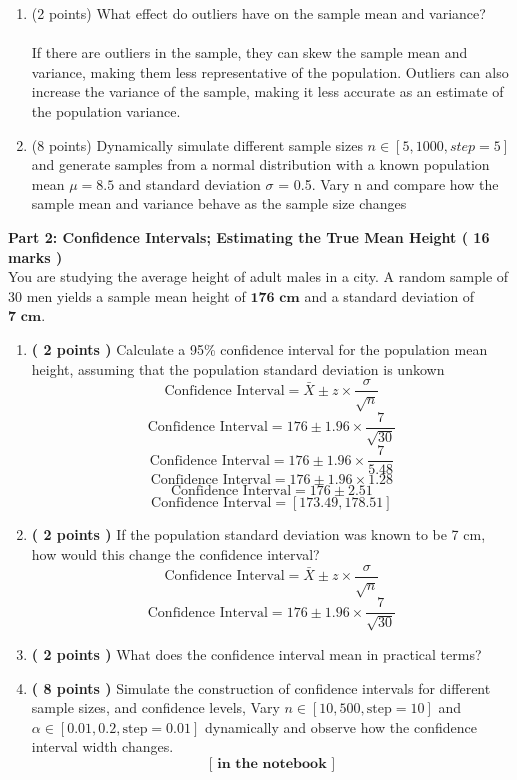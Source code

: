 \documentclass[a3paper,12pt]{extarticle} %
\begin{document}
\begin{enumerate}
        \item (2 points) What effect do outliers have on the sample mean and variance?
        \\ \\ If there are outliers in the sample, they can skew the sample mean and variance, making them less representative of the population. Outliers can also increase the variance of the sample, making it less accurate as an estimate of the population variance.
        \item (8 points) Dynamically simulate different sample sizes \(n \in [5, 1000, step=5]\) and generate samples
        from a normal distribution with a known population mean \(\mu = 8.5\) and standard deviation \(\sigma\) = 0.5.
        Vary n and compare how the sample mean and variance behave as the sample size changes
    \end{enumerate}
    \subitem \textbf{Part 2: Confidence Intervals; Estimating the True Mean Height ( 16  marks )}
    \\ You are studying the average height of adult males in a city. A random sample of 30 men yields a sample mean height of \(\textbf{176 cm}\) and a standard deviation of \(\textbf{7 cm}\). 
    \begin{enumerate}
        \item  \textbf{( 2 points )} Calculate a 95\% confidence interval for the population mean height, assuming that the population standard deviation is unkown
        \[
        \text{Confidence Interval} = \bar{X} \pm z \times \frac{\sigma}{\sqrt{n}}
        \]
        \[
        \text{Confidence Interval} = 176 \pm 1.96 \times \frac{7}{\sqrt{30}}
        \]
        \[
        \text{Confidence Interval} = 176 \pm 1.96 \times \frac{7}{5.48}
        \]
        \[
        \text{Confidence Interval} = 176 \pm 1.96 \times 1.28
        \]
        \[
        \text{Confidence Interval} = 176 \pm 2.51
        \]
        \[
        \text{Confidence Interval} = [173.49, 178.51]
        \]
        \item \textbf{( 2 points )} If the population standard deviation was known to be 7 cm, how would this change the confidence interval?
        \[
        \text{Confidence Interval} = \bar{X} \pm z \times \frac{\sigma}{\sqrt{n}}
        \]
        \[
        \text{Confidence Interval} = 176 \pm 1.96 \times \frac{7}{\sqrt{30}}
        \]
        \item \textbf{( 2 points )} What does the confidence interval mean in practical terms?
        \item \textbf{( 8 points )} Simulate the construction of confidence intervals for different sample sizes, and confidence levels,  Vary \(n \in [10, 500, \text{step}=10]\) and \(\alpha \in [0.01, 0.2, \text{step}=0.01]\) dynamically and observe how the confidence interval width changes.
        \[
        \textbf{[ in the notebook ]}
        \]
    \end{enumerate}
\end{document}
